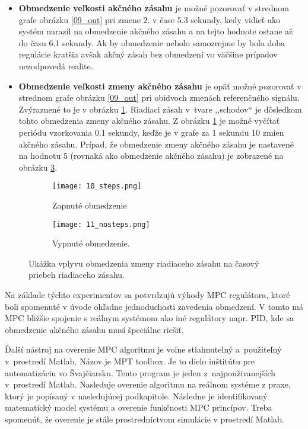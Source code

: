 \begin{itemize}
  \item \textbf{Obmedzenie veľkosti akčného zásahu} je možné pozorovať v strednom grafe obrázku \ref{09_out} pri zmene 2. v čase 5.3 sekundy, kedy vidieť ako systém narazil na obmedzenie akčného zásahu a na tejto hodnote ostane až do času 6.1 sekundy. Ak by obmedzenie nebolo samozrejme by bola doba regulácie kratšia avšak akčný zásah bez obmedzení vo väčšine prípadov nezodpovedá realite.
  \item \textbf{Obmedzenie veľkosti zmeny akčného zásahu} je opäť možné pozorovať v strednom grafe obrázku \ref{09_out} pri obidvoch zmenách referenčného signálu. Zvýraznené to je v obrázku \ref{10_steps}. Riadiaci zásah v~tvare ,,schodov`` je dôsledkom tohto obmedzenia zmeny akčného zásahu. Z obrázku \ref{10_steps} je možné vyčítať periódu vzorkovania 0.1 sekundy, keďže je v grafe za 1 sekundu 10 zmien akčného zásahu. Prípad, že obmedzenie zmeny akčného zásahu je nastavené na hodnotu 5 (rovnaká ako obmedzenie akčného zásahu) je zobrazené na obrázku \ref{11_nosteps}.
\end{itemize}   


\begin{figure}[h]
\centering
\begin{subfigure}{.5\textwidth}
\texttt{[image: 10\_steps.png]}
\caption{Zapnuté obmedzenie}
\label{10_steps}
\end{subfigure}%
\begin{subfigure}{.5\textwidth}
\texttt{[image: 11\_nosteps.png]}
\caption{Vypnuté obmedzenie.}
\label{11_nosteps}
\end{subfigure}
\caption{Ukážka vplyvu obmedzenia zmeny riadiaceho zásahu na časový priebeh riadiaceho zásahu.}
\end{figure}

Na základe týchto experimentov sa potvrdzujú výhody MPC regulátora, ktoré boli spomenuté v úvode ohľadne jednoduchosti zavedenia obmedzení. V tomto má MPC bližšie spojenie s reálnym systémom ako iné regulátory napr. PID, kde sa obmedzenie akčného zásahu musí špeciálne riešiť.

Ďalší nástroj na overenie MPC algoritmu je voľne stiahnuteľný
a~použiteľný v~prostredí Matlab. Názov je MPT toolbox. Je to dielo
inštitútu pre automatizáciu vo Švajčiarsku. Tento program je jeden
z~najpouživanejších v~prostredí Matlab. Nasleduje overenie algoritmu na reálnom systéme z praxe, ktorý je popísaný v nasledujúcej podkapitole. Následne je identifikovaný matematický model systému a overenie funkčnosti MPC princípov. Treba spomenúť, že overenie je stále prostredníctvom simulácie v prostredí Matlab.

